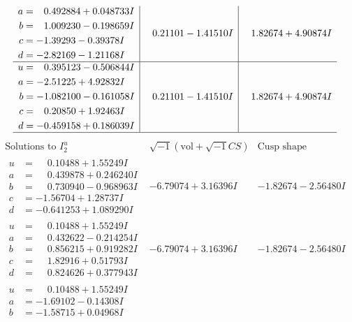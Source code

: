 \documentclass[1p]{elsarticle_modified}
\theoremstyle{definition}
\newcommand{\I}{\sqrt{-1}}
\begin{document}
$$\begin{array}{c|c|c}
\begin{aligned}
a &= \phantom{-}0.492884 + 0.048733 I \\
b &= \phantom{-}1.009230 - 0.198659 I \\
c &= -1.39293 - 0.39378 I \\
d &= -2.82169 - 1.21168 I\end{aligned}
 & \phantom{-}0.21101 - 1.41510 I & \phantom{-}1.82674 + 4.90874 I \\ \hline\begin{aligned}
u &= \phantom{-}0.395123 - 0.506844 I \\
a &= -2.51225 + 4.92832 I \\
b &= -1.082100 - 0.161058 I \\
c &= \phantom{-}0.20850 + 1.92463 I \\
d &= -0.459158 + 0.186039 I\end{aligned}
 & \phantom{-}0.21101 - 1.41510 I & \phantom{-}1.82674 + 4.90874 I\\
 \hline 
 \end{array}$$\newpage$$\begin{array}{c|c|c}  
\text{Solutions to }I^u_{2}& \I (\text{vol} + \sqrt{-1}CS) & \text{Cusp shape}\\
 \hline 
\begin{aligned}
u &= \phantom{-}0.10488 + 1.55249 I \\
a &= \phantom{-}0.439878 + 0.246240 I \\
b &= \phantom{-}0.730940 - 0.968963 I \\
c &= -1.56704 + 1.28737 I \\
d &= -0.641253 + 1.089290 I\end{aligned}
 & -6.79074 + 3.16396 I & -1.82674 - 2.56480 I \\ \hline\begin{aligned}
u &= \phantom{-}0.10488 + 1.55249 I \\
a &= \phantom{-}0.432622 - 0.214254 I \\
b &= \phantom{-}0.856215 + 0.919282 I \\
c &= \phantom{-}1.82916 + 0.51793 I \\
d &= \phantom{-}0.824626 + 0.377943 I\end{aligned}
 & -6.79074 + 3.16396 I & -1.82674 - 2.56480 I \\ \hline\begin{aligned}
u &= \phantom{-}0.10488 + 1.55249 I \\
a &= -1.69102 - 0.14308 I \\
b &= -1.58715 + 0.04968 I \\

\end{aligned}
\end{array}$$
\end{document}
